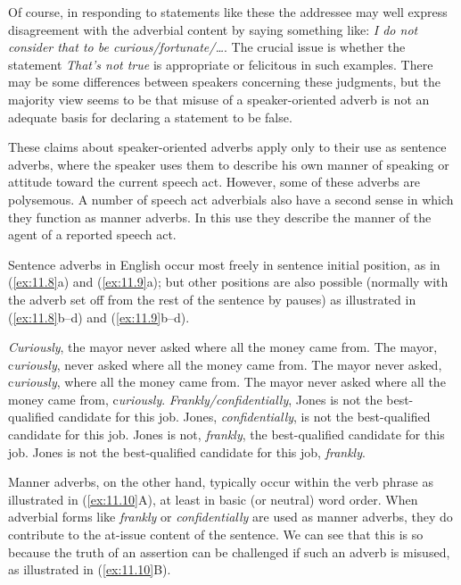 Of course, in responding to statements like these the addressee may well express disagreement with the adverbial content by saying something like: \textit{I do not consider that to be curious/fortunate/…}. The crucial issue is whether the statement \textit{That’s not true} is appropriate or felicitous in such examples. There may be some differences between speakers concerning these judgments, but the majority view seems to be that misuse of a speaker-oriented adverb is not an adequate basis for declaring a statement to be false.


These claims about speaker-oriented adverbs apply only to their use as sentence adverbs, where the speaker uses them to describe his own manner of speaking or attitude toward the current speech act. However, some of these adverbs are polysemous. A number of speech act adverbials also have a second sense in which they function as manner adverbs. In this use they describe the manner of the agent of a reported speech act.


Sentence adverbs in English occur most freely in sentence initial position, as in (\ref{ex:11.8}a) and (\ref{ex:11.9}a); but other positions are also possible (normally with the adverb set off from the rest of the sentence by pauses) as illustrated in (\ref{ex:11.8}b--d) and (\ref{ex:11.9}b--d).\largerpage


\ea \label{ex:11.8}
\ea \textit{Curiously}, the mayor never asked where all the money came from.
\ex The mayor, c\textit{uriously}, never asked where all the money came from.
\ex The mayor never asked, c\textit{uriously}, where all the money came from.
\ex The mayor never asked where all the money came from, c\textit{uriously}.
       \z
\ex \label{ex:11.9}
\ea \textit{Frankly/confidentially}, Jones is not the best-qualified candidate for this job.
\ex Jones, \textit{confidentially}, is not the best-qualified candidate for this job.
\ex Jones is not, \textit{frankly}, the best-qualified candidate for this job.
\ex Jones is not the best-qualified candidate for this job, \textit{frankly}.
                       \z
\z

Manner adverbs, on the other hand, typically occur within the verb phrase as illustrated in (\ref{ex:11.10}A), at least in basic (or neutral) word order. When adverbial forms like \textit{frankly} or \textit{confidentially} are used as manner adverbs, they do contribute to the at-issue content of the sentence. We can see that this is so because the truth of an assertion can be challenged if such an adverb is misused, as illustrated in (\ref{ex:11.10}B).




